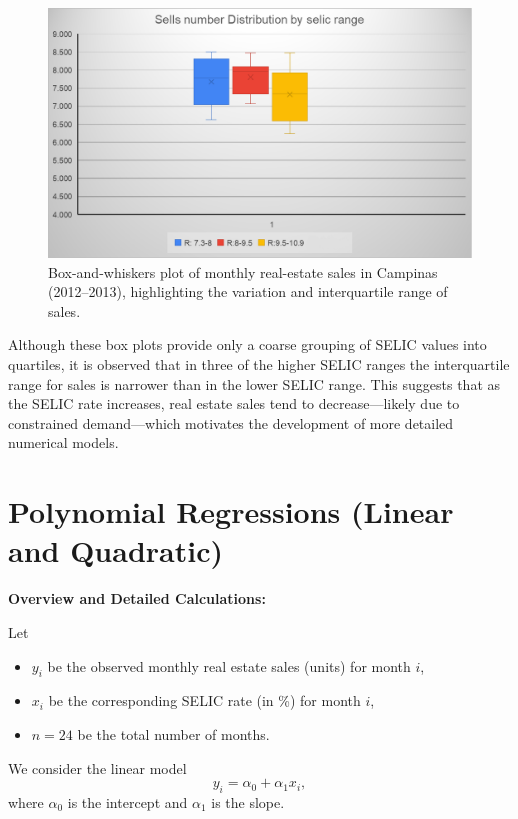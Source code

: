 \documentclass{article}
\begin{document}
\begin{figure}[H]
    \centering
    \includegraphics[width=120mm]{IMG_1062.png}
    \caption{Box-and-whiskers plot of monthly real-estate sales in Campinas (2012--2013), highlighting the variation and interquartile range of sales.}
    \label{fig:sales_boxplot}
\end{figure}

Although these box plots provide only a coarse grouping of SELIC values into quartiles, it is observed that in three of the higher SELIC ranges the interquartile range for sales is narrower than in the lower SELIC range. This suggests that as the SELIC rate increases, real estate sales tend to decrease—likely due to constrained demand—which motivates the development of more detailed numerical models.

\section{Polynomial Regressions (Linear and Quadratic)}
\label{sec:poly}

\textbf{Overview and Detailed Calculations:}

Let 
\begin{itemize}
    \item \(y_i\) be the observed monthly real estate sales (units) for month \(i\),
    \item \(x_i\) be the corresponding SELIC rate (in \%) for month \(i\),
    \item \(n=24\) be the total number of months.
\end{itemize}

We consider the linear model
\[
y_i = \alpha_0 + \alpha_1 x_i,
\]
where \(\alpha_0\) is the intercept and \(\alpha_1\) is the slope.
\end{document}

